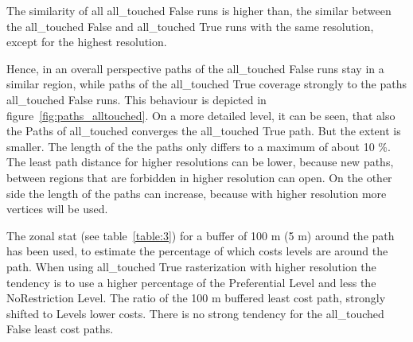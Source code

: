 \documentclass[acmtog]{acmart}
\begin{document}
	The similarity of all all\_touched False runs is higher than, the similar between the all\_touched False and all\_touched True runs with the same resolution, except for the highest resolution.
	
	Hence, in an overall perspective paths of the all\_touched False runs stay in a
	similar region, while paths of the all\_touched True coverage strongly to the paths all\_touched False runs. This behaviour is depicted in figure~\ref{fig:paths_alltouched}. 
	On a more detailed level, it can be seen, that also the Paths of all\_touched 	converges the all\_touched True path.
	But the extent is smaller.
	The length of the the paths only differs to a maximum of about 10 \%.
	The least path distance for higher resolutions can be lower, because new paths, between regions that are forbidden
	in higher resolution can open.
	On the other side the length of the paths can increase, because with higher resolution more vertices will be used.
	
	The zonal stat (see table~\ref{table:3}) for a buffer of 100 m (5 m) around the path has been used, to estimate the
	percentage of which costs levels are around the path.
	When using all\_touched True rasterization with higher resolution the tendency is to use a higher percentage of the
	Preferential Level and less the NoRestriction Level.
	The ratio of the 100 m buffered least cost path, strongly shifted  to Levels lower costs.
	There is no strong tendency for the all\_touched False least cost paths.
	
	
	
	
	\setlength{\tabcolsep}{10pt}
	
\end{document}
